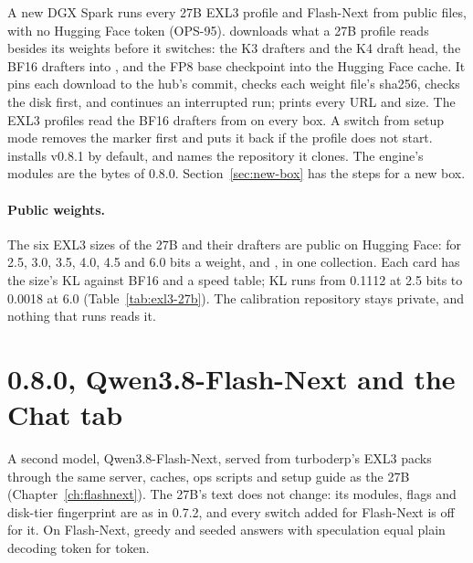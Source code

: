A new DGX Spark runs every 27B EXL3 profile and Flash-Next from public files, with no Hugging Face token (OPS-95).  downloads what a 27B profile reads besides its weights before it switches: the K3 drafters and the K4 draft head, the BF16 drafters into , and the FP8 base checkpoint into the Hugging Face cache. It pins each download to the hub's commit, checks each weight file's sha256, checks the disk first, and continues an interrupted run;  prints every URL and size. The EXL3 profiles read the BF16 drafters from  on every box. A switch from setup mode removes the marker first and puts it back if the profile does not start.  installs v0.8.1 by default, and  names the repository it clones. The engine's modules are the bytes of 0.8.0. Section~\ref{sec:new-box} has the steps for a new box.

\paragraph{Public weights.} The six EXL3 sizes of the 27B and their drafters are public on Hugging Face:  for 2.5, 3.0, 3.5, 4.0, 4.5 and 6.0 bits a weight, and , in one collection. Each card has the size's KL against BF16 and a speed table; KL runs from 0.1112 at 2.5 bits to 0.0018 at 6.0 (Table~\ref{tab:exl3-27b}). The calibration repository stays private, and nothing that runs reads it.


\section{0.8.0, Qwen3.8-Flash-Next and the Chat tab}\label{sec:changelog-080}

A second model, Qwen3.8-Flash-Next, served from turboderp's EXL3 packs through the same server, caches, ops scripts and setup guide as the 27B (Chapter~\ref{ch:flashnext}). The 27B's text does not change: its modules, flags and disk-tier fingerprint are as in 0.7.2, and every switch added for Flash-Next is off for it. On Flash-Next, greedy and seeded answers with speculation equal plain decoding token for token.

